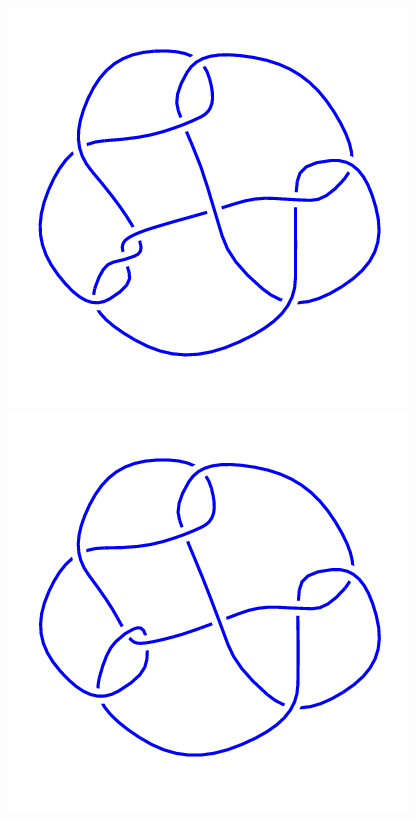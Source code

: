 \begin{figure}[H]
	\begin{minipage}[b]{.18\linewidth}
		\centering
		\includegraphics[width=\linewidth]{../data/10_72.png}
	\end{minipage}
	\begin{minipage}[b]{.18\linewidth}
		\centering
		\includegraphics[width=\linewidth]{../data/10_73.png}

\end{minipage}
\end{figure}
